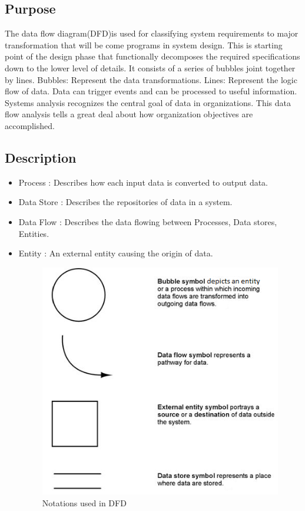 \documentclass[12pt,a4paper,oneside]{report}
\begin{document}
{\subsection {Purpose} 
\par The data ﬂow diagram(DFD)is used for classifying system requirements to major transformation that will be come programs in system design. This is starting point of the design phase that functionally decomposes the required specifications down to the lower level of details. It consists of a series of bubbles joint together by lines. Bubbles: Represent the data transformations. Lines: Represent the logic ﬂow of data. Data can trigger events and can be processed to useful information. Systems analysis recognizes the central goal of data in organizations. This data flow analysis tells a great deal about how organization objectives are accomplished.


\subsection{Description}
\begin{itemize}
\item  Process : Describes how each input data is converted to output data.
\item  Data Store : Describes the repositories of data in a system.
\item   Data Flow : Describes the data ﬂowing between Processes, Data stores, Entities.
\item   Entity : An external entity causing the origin of data.
\begin{figure}[h]
\begin{center}
\includegraphics[scale=0.75]{dfd.png}
\caption{Notations used in  DFD}
\label{Notations used in  DFD}
\end{center}
\end{figure}
\end{itemize}
\newpage


}
\end{document}
